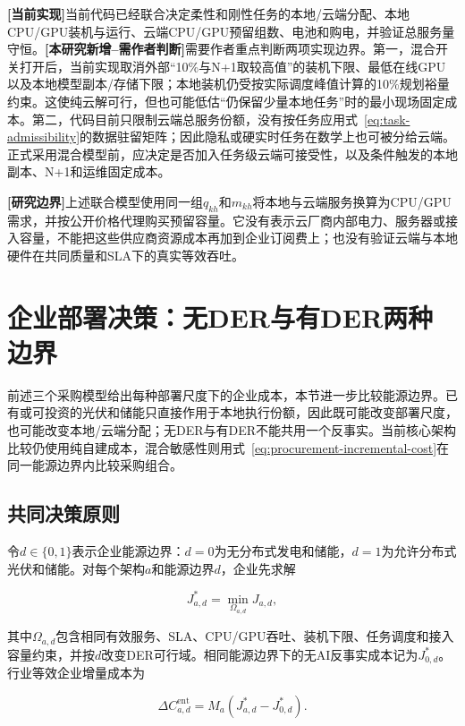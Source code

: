 \documentclass[preprint]{elsarticle}
\newcommand{\implemented}{\textcolor{green!40!black}{\textbf{[当前实现]}}}
\newcommand{\newwork}{\textcolor{orange!80!black}{\textbf{[本研究新增--需作者判断]}}}
\newcommand{\boundary}{\textcolor{black!65}{\textbf{[研究边界]}}}
\begin{document}
\implemented 当前代码已经联合决定柔性和刚性任务的本地/云端分配、本地CPU/GPU装机与运行、云端CPU/GPU预留组数、电池和购电，并验证总服务量守恒。\newwork 需要作者重点判断两项实现边界。第一，混合开关打开后，当前实现取消外部“10\%与N+1取较高值”的装机下限、最低在线GPU以及本地模型副本/存储下限；本地装机仍受按实际调度峰值计算的10\%规划裕量约束。这使纯云解可行，但也可能低估“仍保留少量本地任务”时的最小现场固定成本。第二，代码目前只限制云端总服务份额，没有按任务应用式~\eqref{eq:task-admissibility}的数据驻留矩阵；因此隐私或硬实时任务在数学上也可被分给云端。正式采用混合模型前，应决定是否加入任务级云端可接受性，以及条件触发的本地副本、N+1和运维固定成本。

\boundary 上述联合模型使用同一组$q_{kh}$和$m_{kh}$将本地与云端服务换算为CPU/GPU需求，并按公开价格代理购买预留容量。它没有表示云厂商内部电力、服务器或接入容量，不能把这些供应商资源成本再加到企业订阅费上；也没有验证云端与本地硬件在共同质量和SLA下的真实等效吞吐。

\section{企业部署决策：无DER与有DER两种边界}

前述三个采购模型给出每种部署尺度下的企业成本，本节进一步比较能源边界。已有或可投资的光伏和储能只直接作用于本地执行份额，因此既可能改变部署尺度，也可能改变本地/云端分配；无DER与有DER不能共用一个反事实。当前核心架构比较仍使用纯自建成本，混合敏感性则用式~\eqref{eq:procurement-incremental-cost}在同一能源边界内比较采购组合。

\subsection{共同决策原则}

令$d\in\{0,1\}$表示企业能源边界：$d=0$为无分布式发电和储能，$d=1$为允许分布式光伏和储能。对每个架构$a$和能源边界$d$，企业先求解

\begin{equation}
 J_{a,d}^{*}=\min_{\Omega_{a,d}}J_{a,d},
 \label{eq:enterprise-solve}
\end{equation}

其中$\Omega_{a,d}$包含相同有效服务、SLA、CPU/GPU吞吐、装机下限、任务调度和接入容量约束，并按$d$改变DER可行域。相同能源边界下的无AI反事实成本记为$J_{0,d}^{*}$。行业等效企业增量成本为

\begin{equation}
 \Delta C^{\mathrm{ent}}_{a,d}
 =M_a\left(J_{a,d}^{*}-J_{0,d}^{*}\right).
 \label{eq:enterprise-incremental-cost}
\end{equation}
\end{document}
